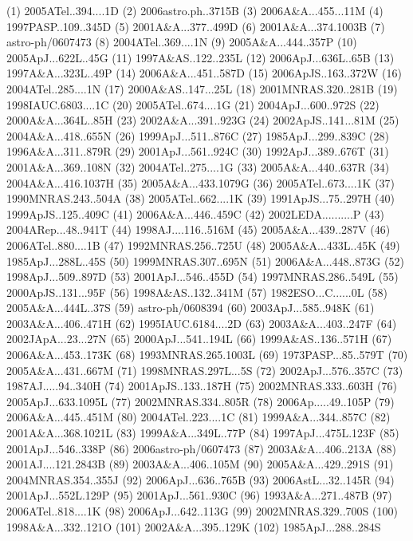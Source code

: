 


(1) 2005ATel..394....1D
(2) 2006astro.ph..3715B
(3) 2006A\&A...455...11M
(4) 1997PASP..109..345D
(5) 2001A\&A...377..499D
(6) 2001A\&A...374.1003B
(7) astro-ph/0607473
(8) 2004ATel..369....1N
(9) 2005A\&A...444..357P
(10) 2005ApJ...622L..45G
(11) 1997A\&AS..122..235L
(12) 2006ApJ...636L..65B
(13) 1997A\&A...323L..49P
(14) 2006A\&A...451..587D
(15) 2006ApJS..163..372W
(16) 2004ATel..285....1N
(17) 2000A\&AS..147...25L
(18) 2001MNRAS.320..281B
(19) 1998IAUC.6803....1C
(20) 2005ATel..674....1G
(21) 2004ApJ...600..972S
(22) 2000A\&A...364L..85H
(23) 2002A\&A...391..923G
(24) 2002ApJS..141...81M
(25) 2004A\&A...418..655N
(26) 1999ApJ...511..876C
(27) 1985ApJ...299..839C
(28) 1996A\&A...311..879R
(29) 2001ApJ...561..924C
(30) 1992ApJ...389..676T
(31) 2001A\&A...369..108N
(32) 2004ATel..275....1G
(33) 2005A\&A...440..637R
(34) 2004A\&A...416.1037H
(35) 2005A\&A...433.1079G
(36) 2005ATel..673....1K
(37) 1990MNRAS.243..504A
(38) 2005ATel..662....1K
(39) 1991ApJS...75..297H
(40) 1999ApJS..125..409C
(41) 2006A\&A...446..459C
(42) 2002LEDA..........P
(43) 2004ARep...48..941T
(44) 1998AJ....116..516M
(45) 2005A\&A...439..287V
(46) 2006ATel..880....1B
(47) 1992MNRAS.256..725U
(48) 2005A\&A...433L..45K
(49) 1985ApJ...288L..45S
(50) 1999MNRAS.307..695N
(51) 2006A\&A...448..873G
(52) 1998ApJ...509..897D
(53) 2001ApJ...546..455D
(54) 1997MNRAS.286..549L
(55) 2000ApJS..131...95F
(56) 1998A\&AS..132..341M
(57) 1982ESO...C......0L
(58) 2005A\&A...444L..37S
(59) astro-ph/0608394
(60) 2003ApJ...585..948K
(61) 2003A\&A...406..471H
(62) 1995IAUC.6184....2D
(63) 2003A\&A...403..247F
(64) 2002JApA...23...27N
(65) 2000ApJ...541..194L
(66) 1999A\&AS..136..571H
(67) 2006A\&A...453..173K
(68) 1993MNRAS.265.1003L
(69) 1973PASP...85..579T
(70) 2005A\&A...431..667M
(71) 1998MNRAS.297L...5S
(72) 2002ApJ...576..357C
(73) 1987AJ.....94..340H
(74) 2001ApJS..133..187H
(75) 2002MNRAS.333..603H
(76) 2005ApJ...633.1095L
(77) 2002MNRAS.334..805R
(78) 2006Ap.....49..105P
(79) 2006A\&A...445..451M
(80) 2004ATel..223....1C
(81) 1999A\&A...344..857C
(82) 2001A\&A...368.1021L
(83) 1999A\&A...349L..77P
(84) 1997ApJ...475L.123F
(85) 2001ApJ...546..338P
(86) 2006astro-ph/0607473
(87) 2003A\&A...406..213A
(88) 2001AJ....121.2843B
(89) 2003A\&A...406..105M
(90) 2005A\&A...429..291S
(91) 2004MNRAS.354..355J
(92) 2006ApJ...636..765B
(93) 2006AstL...32..145R
(94) 2001ApJ...552L.129P
(95) 2001ApJ...561..930C
(96) 1993A\&A...271..487B
(97) 2006ATel..818....1K
(98) 2006ApJ...642..113G
(99) 2002MNRAS.329..700S
(100) 1998A\&A...332..121O
(101) 2002A\&A...395..129K
(102) 1985ApJ...288..284S
